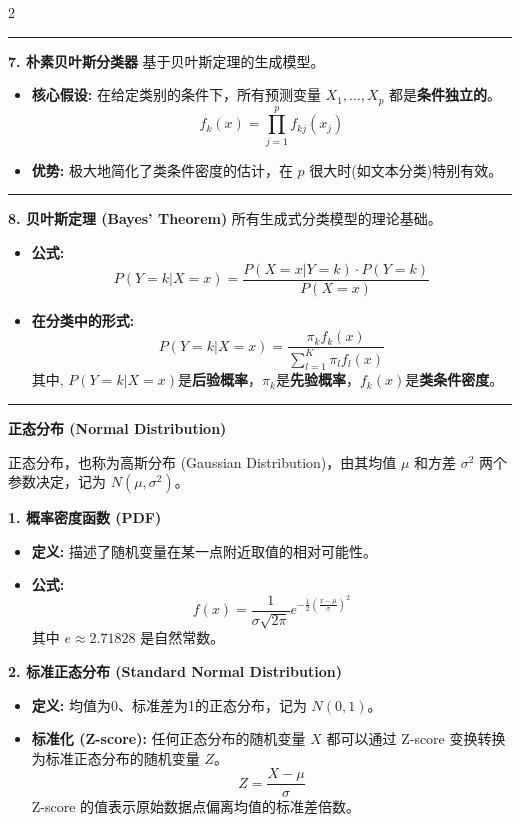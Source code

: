 \documentclass[9pt,a4paper]{article} %
\newcommand{\mysection}[1]{\vspace{0.5em}\hrule\vspace{0.3em}\noindent\textbf{\large #1}\vspace{0.1em}}
\begin{document}
\begin{multicols}{2}
\begin{itemize}
\mysection{7. 朴素贝叶斯分类器}
基于贝叶斯定理的生成模型。
\begin{itemize}
    \item \textbf{核心假设:} 在给定类别的条件下，所有预测变量 $X_1, \dots, X_p$ 都是\textbf{条件独立的}。
    $$ f_k(x) = \prod_{j=1}^{p} f_{kj}(x_j) $$
    \item \textbf{优势:} 极大地简化了类条件密度的估计，在 $p$ 很大时(如文本分类)特别有效。
\end{itemize}

\mysection{8. 贝叶斯定理 (Bayes' Theorem)}
所有生成式分类模型的理论基础。
\begin{itemize}
    \item \textbf{公式:}
    $$ P(Y=k|X=x) = \frac{P(X=x|Y=k) \cdot P(Y=k)}{P(X=x)} $$
    \item \textbf{在分类中的形式:}
    $$ P(Y=k|X=x) = \frac{\pi_k f_k(x)}{\sum_{l=1}^{K} \pi_l f_l(x)} $$
    其中, $P(Y=k|X=x)$是\textbf{后验概率}，$\pi_k$是\textbf{先验概率}，$f_k(x)$是\textbf{类条件密度}。
\end{itemize}












 \end{itemize}
 
 
 \mysection{正态分布 (Normal Distribution)}

正态分布，也称为高斯分布 (Gaussian Distribution)，由其均值 $\mu$ 和方差 $\sigma^2$ 两个参数决定，记为 $N(\mu, \sigma^2)$。

\textbf{1. 概率密度函数 (PDF)}
\begin{itemize}
    \item \textbf{定义:} 描述了随机变量在某一点附近取值的相对可能性。
    \item \textbf{公式:}
    $$ f(x) = \frac{1}{\sigma\sqrt{2\pi}} e^{ - \frac{1}{2} \left( \frac{x-\mu}{\sigma} \right)^2 } $$
    其中 $e \approx 2.71828$ 是自然常数。
\end{itemize}

\textbf{2. 标准正态分布 (Standard Normal Distribution)}
\begin{itemize}
    \item \textbf{定义:} 均值为0、标准差为1的正态分布，记为 $N(0, 1)$。
    \item \textbf{标准化 (Z-score):} 任何正态分布的随机变量 $X$ 都可以通过 Z-score 变换转换为标准正态分布的随机变量 $Z$。
    $$ Z = \frac{X - \mu}{\sigma} $$
    Z-score 的值表示原始数据点偏离均值的标准差倍数。
\end{itemize}


\end{multicols}
\end{document}
